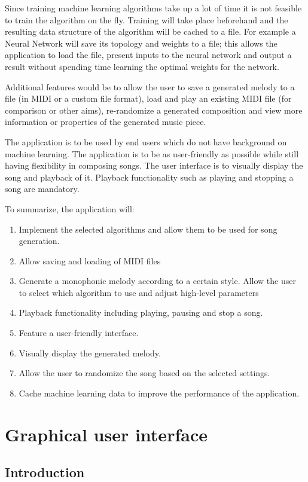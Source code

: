 Since training machine learning algorithms take up a lot of time it is not feasible to train the algorithm on the fly. Training will take place beforehand and the resulting data structure of the algorithm will be cached to a file. 
For example a Neural Network will save its topology and weights to a file; this allows the application to load the file, present inputs to the neural network and output a result without spending time learning the optimal weights for the network.

Additional features would be to allow the user to save a generated melody to a file (in \ac{MIDI} or a custom file format), load and play an existing \ac{MIDI} file (for comparison or other aims), re-randomize a generated composition and view more information or properties of the generated music piece.

The application is to be used by end users which do not have background on machine learning. The application is to be as user-friendly as possible while still having flexibility in composing songs. The user interface is to visually display the song and playback of it. Playback functionality such as playing and stopping a song are mandatory.

To summarize, the application will:
\begin{enumerate}
\item Implement the selected algorithms and allow them to be used for song generation.
\item Allow saving and loading of \ac{MIDI} files
\item Generate a monophonic melody according to a certain style. Allow the user to select which algorithm to use and adjust high-level parameters
\item Playback functionality including playing, pausing and stop a song. 
\item Feature a user-friendly interface.
\item Visually display the generated melody.
\item Allow the user to randomize the song based on the selected settings.
\item Cache machine learning data to improve the performance of the application.
\end{enumerate}

\chapter{Graphical user interface}

\section{Introduction}

